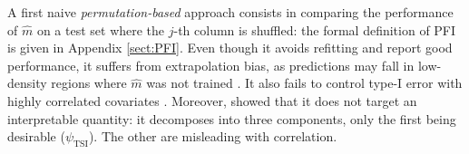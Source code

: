 \documentclass{article}
\theoremstyle{plain}
\theoremstyle{definition}
\newtheorem{definition}[theorem]{Definition}
\theoremstyle{remark}
\begin{document}
A first naive \textit{permutation-based} approach consists in comparing the performance of $\widehat{m}$ on a test set where the $j$-th column is shuffled: the formal definition of PFI is given in Appendix \ref{sect:PFI}.
%
Even though it avoids refitting and \citet{Mi2021} report good performance, it suffers from extrapolation bias, as predictions may fall in low-density regions where $\widehat{m}$ was not trained \citep{Hooker2021}. It also fails to control type-I error with highly correlated covariates \citep{chamma2024statistically}. Moreover, \citet{scornet2022mda} showed that it does not target an interpretable quantity: it decomposes into three components, only the first being desirable ($\psi_\mathrm{TSI}$). The other are misleading with correlation.
\end{document}
